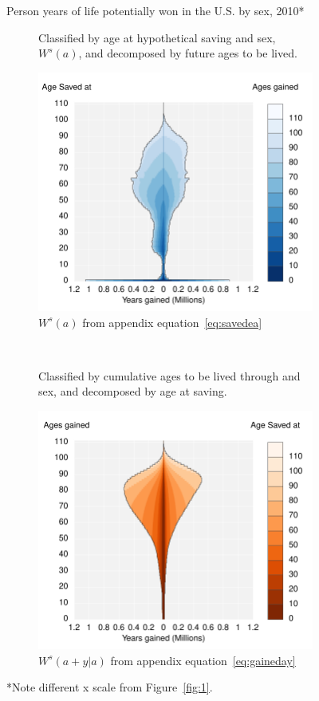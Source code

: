 \documentclass{article}
\begin{document}
\begin{figure}
\centering
\caption{Person years of life potentially won in the U.S. by sex, 2010*}
\label{fig:2}
\begin{subfigure}[b]{.48\linewidth}
\centering
	\caption{Classified by age at hypothetical saving and sex, $W^s(a)$, and
	decomposed by future ages to be lived.}
	\label{fig:SavedGained}
	\includegraphics[scale=.55]{Figures/YearsSavedGainedxx10.pdf}
	\caption*{$W^s(a)$ from appendix equation~\ref{eq:savedea}}	
\end{subfigure}
~
\begin{subfigure}[b]{.48\linewidth}
\centering
    \caption{Classified by cumulative ages to be lived through and sex, and
    decomposed by age at saving.}
	\label{fig:LostLived}
    \includegraphics[scale=.55]{Figures/YearsLostLivedyx10.pdf}
    \caption*{$W^s(a+y|a)$ from appendix equation~\ref{eq:gaineday}}	
\end{subfigure}
\caption*{*Note different x scale from Figure~\ref{fig:1}.}
\end{figure}
\end{document}
